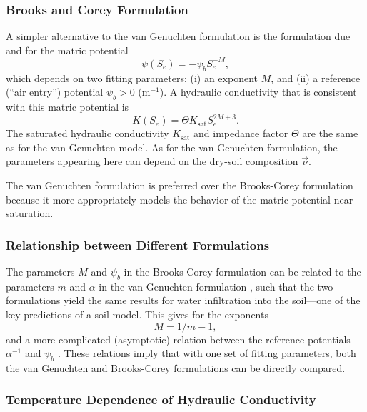 \documentclass{report}
\begin{document}
\subsubsection{Brooks and Corey Formulation}

A simpler alternative to the van Genuchten formulation is the formulation due \citet{Brooks64a}  and \citet{Corey77a} for the matric potential
\begin{equation}\label{e:Brooks_Corey_potential}
    \psi(S_e) = - \psi_b S_e^{-M},
\end{equation}
which depends on two fitting parameters: (i) an exponent $M$, and (ii) a reference (``air entry'') potential $\psi_b>0$ ($\mathrm{m^{-1}}$). A hydraulic conductivity that is consistent with this matric potential is 
\begin{equation}
     K(S_e) = \Theta K_{\mathrm{sat}} S_e^{2M+3}.
\end{equation}
The saturated hydraulic conductivity $ K_{\mathrm{sat}}$ and impedance factor $\Theta$ are the same as for the van Genuchten model. As for the van Genuchten formulation, the parameters appearing here can depend on the dry-soil composition $\vec{\nu}$. 

The van Genuchten formulation is preferred over the Brooks-Corey formulation because it more appropriately models the behavior of the matric potential near saturation. 

\subsubsection{Relationship between Different Formulations}

The parameters $M$ and $\psi_b$ in the Brooks-Corey formulation can be related to the parameters $m$ and $\alpha$ in the van Genuchten formulation \citep{Morel-Seytoux96a}, such that the two formulations yield the same results for water infiltration into the soil---one of the key predictions of a soil model. This gives for the exponents 
\[
M = 1/m - 1,
\]
and a more complicated (asymptotic) relation between the reference potentials $\alpha^{-1}$ and $\psi_b$ \citep{Morel-Seytoux96a}. These relations imply that with one set of fitting parameters, both the van Genuchten and Brooks-Corey formulations can be directly compared. 

\subsubsection{Temperature Dependence of Hydraulic Conductivity}
\end{document}
